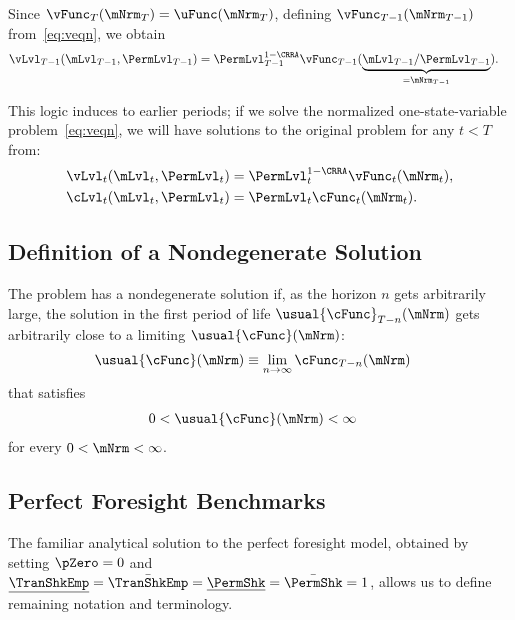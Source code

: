 \documentclass[BufferStockTheory]{subfiles}
\begin{document}
Since $\vFunc_{T}(\mNrm_{T}) = \uFunc(\mNrm_{T})$, defining $\vFunc_{T-1}(\mNrm_{T-1})$ from~\eqref{eq:veqn}, we obtain
\begin{align*}
  \vLvl_{T-1}(\mLvl_{T-1},\PermLvl_{T-1})  & = \PermLvl_{T-1}^{1-\CRRA} \vFunc_{T-1}(\underbrace{\mLvl_{T-1}/\PermLvl_{T-1}}_{=\mNrm_{T-1}}).
\end{align*}

This logic induces to earlier periods; if we solve the normalized one-state-variable problem~\eqref{eq:veqn}, we will have solutions to the original problem for any $t<T$ from:
\begin{align*}
  \vLvl_{t}(\mLvl_{t},\PermLvl_{t})  & = \PermLvl_{t}^{1-\CRRA}\vFunc_{t}(\mNrm_{t}),
  \\ \cLvl_{t}(\mLvl_{t},\PermLvl_{t})  & = \PermLvl_{t}\cFunc_{t}(\mNrm_{t}).
\end{align*}

\hypertarget{Definition-of-a-Nondegenerate-Solution}{}
\subsection{Definition of a Nondegenerate Solution}

The problem has a nondegenerate solution if, as the horizon $n$ gets arbitrarily large, the solution in the first period of life $\usual{\cFunc}_{T-n}(\mNrm)$ gets arbitrarily close to a limiting $\usual{\cFunc}(\mNrm)$:
\begin{align*}
  \usual{\cFunc}(\mNrm)  & \equiv  \lim_{n \rightarrow \infty} \cFunc_{T-n}(\mNrm) \notag
\end{align*}
that satisfies
\begin{equation}\begin{gathered}\begin{aligned}
  0 & < \usual{\cFunc}(\mNrm) <  \infty
\end{aligned}\end{gathered}\end{equation}
for every $0 < \mNrm < \infty$.

\hypertarget{Perfect-Foresight-Benchmarks}{}
\subsection{Perfect Foresight Benchmarks}

The familiar analytical solution to the perfect foresight model, obtained by setting $\pZero=0$ and $\underline{\TranShkEmp}=\bar{\TranShkEmp}=\underline{\PermShk}=\bar{\PermShk}=1$, allows us to define remaining notation and terminology.
\end{document}
